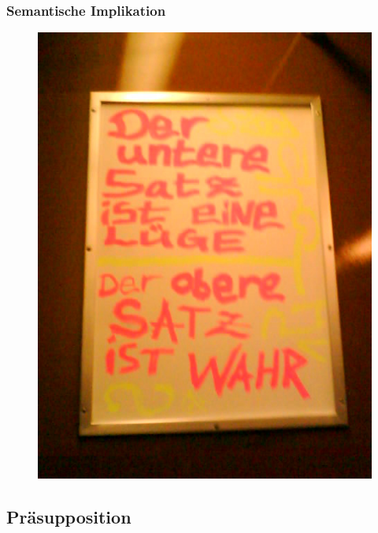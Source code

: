 \begin{frame}
\frametitle{Semantische Implikation}

\begin{figure}
\centering

\includegraphics[scale=0.3]{material/13Pragv}

\end{figure}

\end{frame}


%
\subsection{Präsupposition}
%

